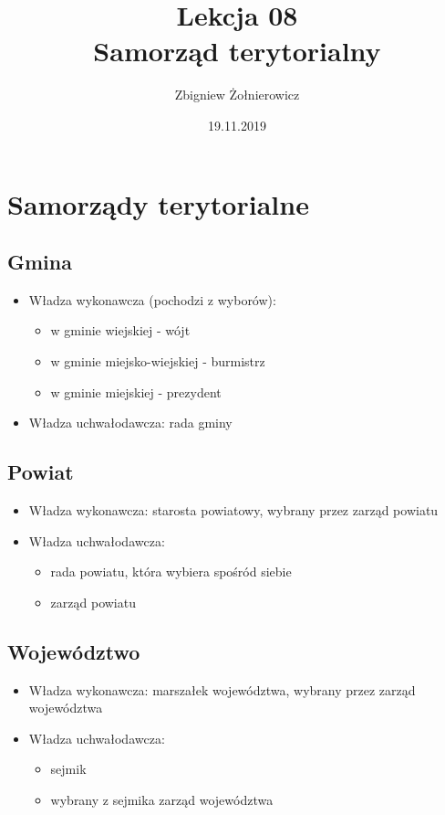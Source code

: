 \documentclass[a4paper]{article}
\begin{document}
\title{{\huge Lekcja 08} \\
{\large Samorząd terytorialny}}
\author{Zbigniew Żołnierowicz}
\date{19.11.2019}
\maketitle
\section{Samorządy terytorialne}
\subsection{Gmina}
\begin{itemize}
    \item Władza wykonawcza (pochodzi z wyborów):
        \begin{itemize}
            \item w gminie wiejskiej - wójt
            \item w gminie miejsko-wiejskiej - burmistrz
            \item w gminie miejskiej - prezydent
        \end{itemize}
    \item Władza uchwałodawcza: rada gminy
\end{itemize}
\subsection{Powiat}
\begin{itemize}
    \item Władza wykonawcza: starosta powiatowy, wybrany przez zarząd powiatu
    \item Władza uchwałodawcza:
        \begin{itemize}
            \item rada powiatu, która wybiera spośród siebie
            \item zarząd powiatu
        \end{itemize}
\end{itemize}
\subsection{Województwo}
\begin{itemize}
    \item Władza wykonawcza: marszałek województwa, wybrany przez zarząd województwa
    \item Władza uchwałodawcza:
        \begin{itemize}
            \item sejmik
            \item wybrany z sejmika zarząd województwa
        \end{itemize}
\end{itemize}
\end{document}
